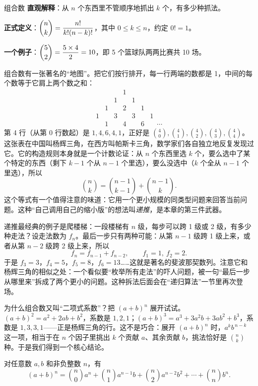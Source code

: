 \begin{shuyu}{组合数}
\textbf{直观解释}：从 $n$ 个东西里不管顺序地抓出 $k$ 个，有多少种抓法。

\textbf{正式定义}：$\dbinom{n}{k}=\dfrac{n!}{k!(n-k)!}$，其中 $0\le k\le n$，约定 $0!=1$。

\textbf{一个例子}：$\dbinom{5}{2}=\dfrac{5\times4}{2}=10$，即 5 个篮球队两两比赛共 10 场。
\end{shuyu}

组合数有一张著名的“地图”。把它们按行排开，每一行两端的数都是 1，中间的每个数等于它肩上两个数之和：
\[
\begin{array}{ccccccc}
& & & 1 & & &\\
& & 1 & & 1 & &\\
& 1 & & 2 & & 1 &\\
1 & & 3 & & 3 & & 1\\
& 1 & & 4 & & 6 & \quad\cdots
\end{array}
\]
第 4 行（从第 0 行数起）是 $1,4,6,4,1$，正好是 $\binom{4}{0},\binom{4}{1},\binom{4}{2},\binom{4}{3},\binom{4}{4}$。这张表在中国叫杨辉三角，在西方叫帕斯卡三角，数学家们各自独立地反复发现过它。它的构造规则本身就是一个计数论证：从 $n$ 个东西里选 $k$ 个，要么选中了某个特定的东西（剩下 $k-1$ 个从 $n-1$ 个里选），要么没选中（$k$ 个全从 $n-1$ 个里选），所以
\[
\binom{n}{k}=\binom{n-1}{k-1}+\binom{n-1}{k}.
\]
这个等式有一个值得注意的味道：它用一个更小规模的同类型问题来回答当前问题。这种“自己调用自己的缩小版”的想法叫\emph{递推}，是本章的第三件武器。

递推最经典的例子是爬楼梯：一段楼梯有 $n$ 级，每步可以跨 1 级或 2 级，有多少种走法？设走法数为 $f_n$。最后一步只有两种可能：从第 $n-1$ 级跨 1 级上来，或者从第 $n-2$ 级跨 2 级上来，所以
\[
f_n=f_{n-1}+f_{n-2},\qquad f_1=1,\ f_2=2.
\]
于是 $f_3=3$，$f_4=5$，$f_5=8$，$f_6=13$……这就是著名的斐波那契数列。注意它和杨辉三角的相似之处：一个看似要“枚举所有走法”的吓人问题，被一句“最后一步从哪里来”拆成了两个更小的问题。这种拆法后面会在“递归算法”一节里再次登场。

为什么组合数又叫“二项式系数”？把 $(a+b)^n$ 展开试试。$(a+b)^2=a^2+2ab+b^2$，系数是 $1,2,1$；$(a+b)^3=a^3+3a^2b+3ab^2+b^3$，系数是 $1,3,3,1$——正是杨辉三角的行。这不是巧合：展开 $(a+b)^n$ 时，$a^k b^{\,n-k}$ 这一项，相当于在 $n$ 个因子里挑出 $k$ 个贡献 $a$、其余贡献 $b$，挑法恰好是 $\binom{n}{k}$ 种。于是我们得到一个核心结论。

\begin{dingli}[二项式定理]
对任意数 $a,b$ 和非负整数 $n$，有
\[
(a+b)^n=\binom{n}{0}a^n+\binom{n}{1}a^{n-1}b+\binom{n}{2}a^{n-2}b^2+\cdots+\binom{n}{n}b^n.
\]
\end{dingli}

